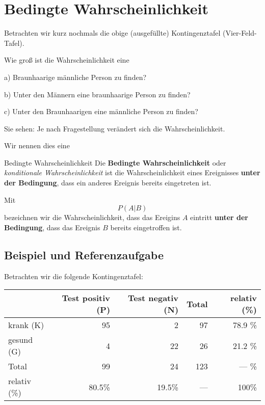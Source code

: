 
\section{Bedingte Wahrscheinlichkeit}

Betrachten wir kurz nochmals die obige (ausgefüllte) Kontingenztafel (Vier-Feld-Tafel).

Wie groß ist die Wahrscheinlichkeit eine

a) Braunhaarige männliche Person zu finden? 

b) Unter den Männern eine braunhaarige Person zu finden? 

c) Unter den Braunhaarigen eine männliche Person zu finden? 

Sie sehen: Je nach Fragestellung verändert sich die Wahrscheinlichkeit.

Wir nennen dies eine

\begin{definition}{Bedingte Wahrscheinlichkeit}{}
Die \textbf{Bedingte Wahrscheinlichkeit} oder \textit{konditionale
  Wahrscheinlichkeit} ist die Wahrscheinlichkeit eines Ereignisses
\textbf{unter der Bedingung}, dass ein anderes Ereignis bereits
eingetreten ist.
  \end{definition}

\begin{definition}{}{}
  Mit
  $$P(A | B)$$
  bezeichnen wir die Wahrscheinlichkeit, dass das Ereigins $A$
  eintritt \textbf{unter der Bedingung}, dass das Ereignis $B$ bereits
  eingetroffen ist.
\end{definition}
\newpage


\subsection{Beispiel und Referenzaufgabe}
Betrachten wir die folgende Kontingenztafel:

  \begin{tabular}{|l|r|r|r|r|}\hline
                 & Test positiv (P) & Test negativ (N)& Total & relativ (\%) \\\hline
    krank (K)        & 95           & 2            & 97    & 78.9 \%      \\\hline    
    gesund (G)    & 4            & 22           & 26    & 21.2 \%      \\\hline
    Total        & 99           & 24           & 123   &  --- \%      \\\hline
    relativ (\%) & 80.5\%       &19.5\%        & ---   &   100\%      \\\hline

  \end{tabular}
  
